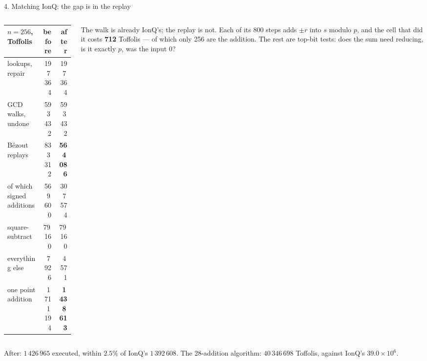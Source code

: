 \documentclass[aspectratio=169,11pt]{beamer}
\begin{document}
\setcounter{framenumber}{173}
\begin{frame}{4. Matching IonQ: the gap is in the replay}
  \begin{columns}[T]
    \begin{column}{0.55\textwidth}
      \centering\footnotesize
      \renewcommand{\arraystretch}{1.12}
      \begin{tabular}{@{}lrr@{}}
        \toprule
        $n=256$, Toffolis & before & after \\
        \midrule
        lookups, repair & 197\,364 & 197\,364 \\
        GCD walks, undone & 593\,432 & 593\,432 \\
        Bézout replays & 833\,312 & \textbf{564\,086} \\
        \quad of which signed additions & 569\,600 & 307\,574 \\
        square-subtract & 79\,160 & 79\,160 \\
        everything else & 7\,926 & 4\,571 \\
        \midrule
        one point addition & 1\,711\,194 & \textbf{1\,438\,613} \\
        \bottomrule
      \end{tabular}
    \end{column}
    \begin{column}{0.41\textwidth}
      \small The walk is already IonQ's; the replay is not. Each of its 800 steps adds $\pm r$ into $s$ modulo $p$, and the cell that did it costs \textbf{712} Toffolis --- of which only 256 are the addition.
      \vskip2mm
      The rest are top-bit tests: does the sum need reducing, is it exactly $p$, was the input $0$?
    \end{column}
  \end{columns}
  \vskip2mm
  {\small\raggedright After: $1\,426\,965$ executed, within $2.5\%$ of IonQ's $1\,392\,608$. The 28-addition algorithm: $40\,346\,698$ Toffolis, against IonQ's $39.0\times10^6$.\par}
\end{frame}
\end{document}
